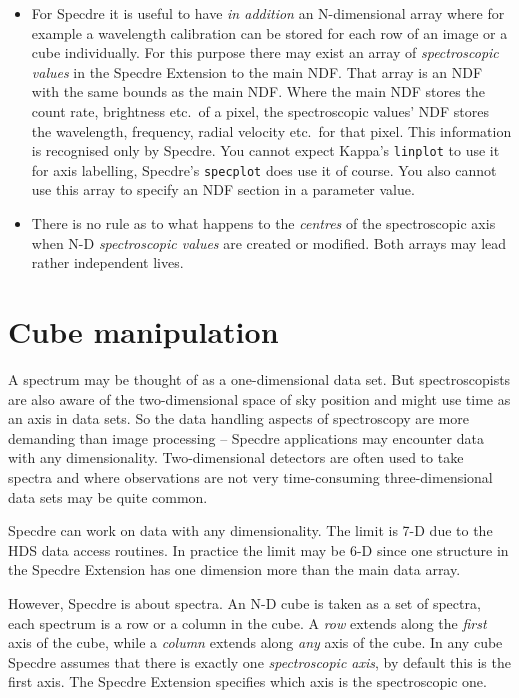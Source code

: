 \begin{itemize}
\item For Specdre it is useful to have {\it in addition} an
   N-dimensional array where for example a wavelength calibration can be
   stored for each row of an image or a cube individually.  For this
   purpose there may exist an array of {\it spectroscopic values} in the
   Specdre Extension to the main NDF.  That array is an NDF with the
   same bounds as the main NDF.  Where the main NDF stores the count
   rate, brightness etc.\ of a pixel, the spectroscopic values' NDF
   stores the wavelength, frequency, radial velocity etc.\ for that
   pixel.  This information is recognised only by Specdre.  You cannot
   expect Kappa's {\tt linplot} to use it for axis labelling, Specdre's
   {\tt specplot} does use it of course.  You also cannot use this array
   to specify an NDF section in a parameter value.

\item There is no rule as to what happens to the {\it centres} of the
   spectroscopic axis when N-D {\it spectroscopic values} are created or
   modified.  Both arrays may lead rather independent lives.
\end{itemize}


\section{\label{cubeman}Cube manipulation}

   A spectrum may be thought of as a one-dimensional data set.  But
   spectroscopists are also aware of the two-dimensional space of sky
   position and might use time as an axis in data sets.  So the data
   handling aspects of spectroscopy are more demanding than image
   processing -- Specdre applications may encounter data with any
   dimensionality.  Two-dimensional detectors are often used to take
   spectra and where observations are not very time-consuming
   three-dimensional data sets may be quite common.

   Specdre can work on data with any dimensionality.  The limit is 7-D
   due to the HDS data access routines.  In practice the limit may be
   6-D since one structure in the Specdre Extension has one dimension
   more than the main data array.

   However, Specdre is about spectra.  An N-D cube is taken as a set of
   spectra, each spectrum is a row or a column in the cube.  A {\it row}
   extends along the {\it first} axis of the cube, while a {\it column}
   extends along {\it any} axis of the cube.  In any cube Specdre
   assumes that there is exactly one {\it spectroscopic axis}, by
   default this is the first axis.  The Specdre Extension specifies
   which axis is the spectroscopic one.

